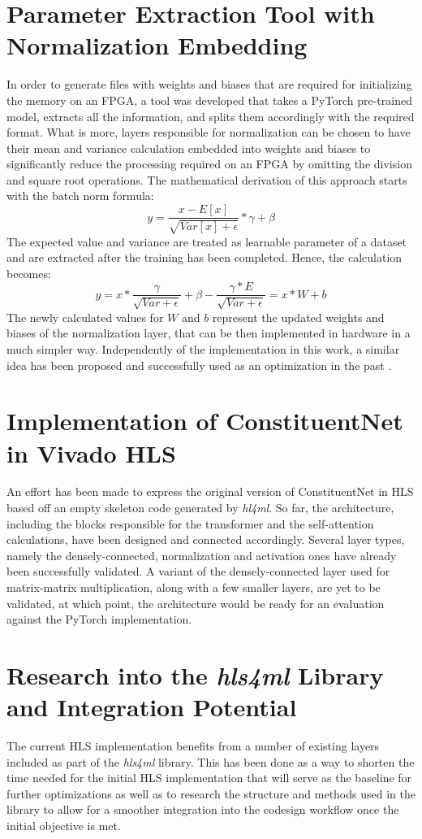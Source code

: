 \section{Parameter Extraction Tool with Normalization Embedding}
In order to generate files with weights and biases that are required for initializing the memory on an FPGA, a tool was developed that takes a PyTorch pre-trained model, extracts all the information, and splits them accordingly with the required format. What is more, layers responsible for normalization can be chosen to have their mean and variance calculation embedded into weights and biases to significantly reduce the processing required on an FPGA by omitting the division and square root operations. The mathematical derivation of this approach starts with the batch norm formula:
\[ y = \frac{x - E[x]}{\sqrt{Var[x] + \epsilon}} * \gamma + \beta \]
The expected value and variance are treated as learnable parameter of a dataset and are extracted after the training has been completed. Hence, the calculation becomes:
\[ y = x * \frac{\gamma}{\sqrt{Var + \epsilon}} + \beta - \frac{\gamma * E}{\sqrt{Var + \epsilon}} = x * W + b\]
The newly calculated values for \(W\) and \(b\) represent the updated weights and biases of the normalization layer, that can be then implemented in hardware in a much simpler way. Independently of the implementation in this work, a similar idea has been proposed and successfully used as an optimization in the past \cite{46-fan2018real-time}.
  
\section{Implementation of ConstituentNet in Vivado HLS}
An effort has been made to express the original version of ConstituentNet in HLS based off an empty skeleton code generated by \textit{hl4ml}. So far, the architecture, including the blocks responsible for the transformer and the self-attention calculations, have been designed and connected accordingly. Several layer types, namely the densely-connected, normalization and activation ones have already been successfully validated. A variant of the densely-connected layer used for matrix-matrix multiplication, along with a few smaller layers, are yet to be validated, at which point, the architecture would be ready for an evaluation against the PyTorch implementation.
  
\section{Research into the \textit{hls4ml} Library and Integration Potential}
The current HLS implementation benefits from a number of existing layers included as part of the \textit{hls4ml} library. This has been done as a way to shorten the time needed for the initial HLS implementation that will serve as the baseline for further optimizations as well as to research the structure and methods used in the library to allow for a smoother integration into the codesign workflow once the initial objective is met.